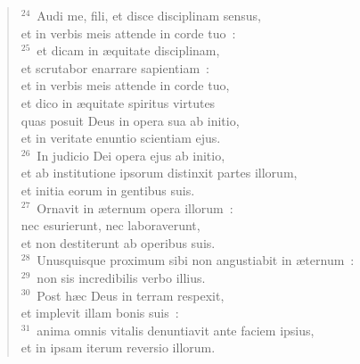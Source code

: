 \begin{verse}${}^{24}$~Audi me, fili, et disce disciplinam sensus,\\ et in verbis meis attende in corde tuo~:\\
${}^{25}$~et dicam in \ae quitate disciplinam,\\ et scrutabor enarrare sapientiam~:\\ et in verbis meis attende in corde tuo,\\ et dico in \ae quitate spiritus virtutes\\ quas posuit Deus in opera sua ab initio,\\ et in veritate enuntio scientiam ejus.\\
${}^{26}$~In judicio Dei opera ejus ab initio,\\ et ab institutione ipsorum distinxit partes illorum,\\ et initia eorum in gentibus suis.\\
${}^{27}$~Ornavit in \ae ternum opera illorum~:\\ nec esurierunt, nec laboraverunt,\\ et non destiterunt ab operibus suis.\\
${}^{28}$~Unusquisque proximum sibi non angustiabit in \ae ternum~:\\
${}^{29}$~non sis incredibilis verbo illius.\\
${}^{30}$~Post h\ae c Deus in terram respexit,\\ et implevit illam bonis suis~:\\
${}^{31}$~anima omnis vitalis denuntiavit ante faciem ipsius,\\ et in ipsam iterum reversio illorum.\end{verse}


